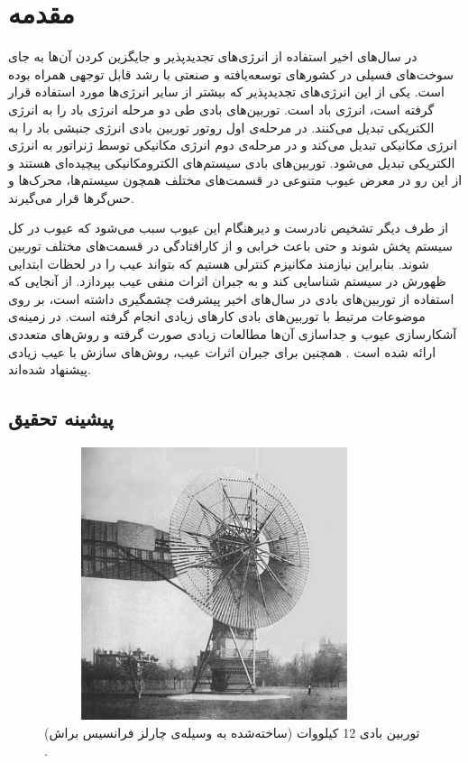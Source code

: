 \chapter{مقدمه}

در سال‌های اخیر استفاده از انرژی‌های تجدید‌پذیر و جایگزین کردن آن‌ها به جای سوخت‌های فسیلی در کشور‌های توسعه‌یافته و صنعتی با رشد قابل توجهی همراه بوده است. یکی از این انرژی‌های تجدید‌پذیر که بیشتر از سایر انرژی‌ها مورد استفاده قرار گرفته است، انرژی باد است.  توربین‌های بادی طی دو مرحله انرژی باد را به انرژی الکتریکی تبدیل می‌کنند. در مرحله‌ی اول روتور توربین بادی انرژی جنبشی باد را به انرژی مکانیکی تبدیل می‌کند و در مرحله‌ی دوم انرژی مکانیکی توسط ژنراتور به انرژی الکتریکی تبدیل می‌شود. توربین‌های بادی سیستم‌های الکترومکانیکی پیچیده‌ای هستند و از این رو در معرض عیوب متنوعی در قسمت‌های مختلف همچون سیستم‌ها، محرک‌ها و حس‌گر‌ها قرار می‌گیرند.

از طرف دیگر تشخیص نادرست و دیر‌هنگام این عیوب سبب می‌شود که عیوب در کل سیستم پخش شوند و حتی باعث خرابی و از کار‌افتادگی در قسمت‌های مختلف توربین شوند. بنابراین نیازمند مکانیزم کنترلی هستیم که بتواند عیب را در لحظات ابتدایی ظهورش در سیستم شناسایی کند و به جبران اثرات منفی عیب بپردازد. از آنجایی که استفاده از توربین‌های بادی در سال‌های اخیر پیشرفت چشمگیری داشته است، بر روی موضوعات مرتبط با توربین‌های بادی کارهای زیادی انجام گرفته است. در زمینه‌ی  آشکارسازی عیوب و جداسازی آن‌ها مطالعات زیادی صورت گرفته و روش‌های متعددی ارائه شده است \cite{b6}. همچنین برای جبران اثرات عیب، روش‌های سازش با  عیب زیادی پیشنهاد شده‌اند.
\section{پیشینه تحقیق}
 
 \begin{figure}[t]
 \centering
\includegraphics[height=8cm,width=10cm]{wt.png}
\caption{ توربین بادی 12 کیلو‌وات (ساخته‌شده به وسیله‌ی چارلز فرانسیس براش) \cite{b1}.}
\label{wt}
\centering
\end{figure}

